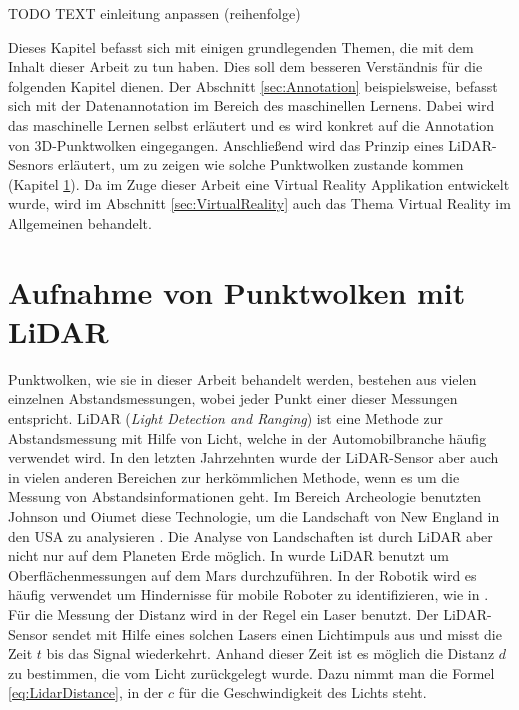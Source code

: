 \graphicspath{{Kapitel/Kapitel2_Grundlagen/Images/}}
TODO TEXT einleitung anpassen (reihenfolge)

Dieses Kapitel befasst sich mit einigen grundlegenden Themen, die mit dem Inhalt dieser Arbeit zu tun haben. Dies soll dem besseren Verständnis für die folgenden Kapitel dienen. Der Abschnitt \ref{sec:Annotation} beispielsweise, befasst sich mit der Datenannotation im Bereich des maschinellen Lernens. Dabei wird das maschinelle Lernen selbst erläutert und es wird konkret auf die Annotation von 3D-Punktwolken eingegangen. Anschließend wird das Prinzip eines LiDAR-Sesnors erläutert, um zu zeigen wie solche Punktwolken zustande kommen (Kapitel \ref{sec:Lidar}). Da im Zuge dieser Arbeit eine Virtual Reality Applikation entwickelt wurde, wird im Abschnitt \ref{sec:VirtualReality} auch das Thema Virtual Reality im Allgemeinen behandelt.

\section{Aufnahme von Punktwolken mit LiDAR}
\label{sec:Lidar}

Punktwolken, wie sie in dieser Arbeit behandelt werden, bestehen aus vielen einzelnen Abstandsmessungen, wobei jeder Punkt einer dieser Messungen entspricht. LiDAR (\textit{Light Detection and Ranging}) ist eine Methode zur Abstandsmessung mit Hilfe von Licht, welche in der Automobilbranche häufig verwendet wird. In den letzten Jahrzehnten wurde der LiDAR-Sensor aber auch in vielen anderen Bereichen zur herkömmlichen Methode, wenn es um die Messung von Abstandsinformationen geht. Im Bereich Archeologie benutzten Johnson und Oiumet diese Technologie, um die Landschaft von New England in den USA zu analysieren \cite{bib:LidarArcheology}. Die Analyse von Landschaften ist durch LiDAR aber nicht nur auf dem Planeten Erde möglich. In \cite{bib:LidarSpace} wurde LiDAR benutzt um Oberflächenmessungen auf dem Mars durchzuführen. In der Robotik wird es häufig verwendet um Hindernisse für mobile Roboter zu identifizieren, wie in \cite{bib:LidarRobotic}.\\

Für die Messung der Distanz wird in der Regel ein Laser benutzt. Der LiDAR-Sensor sendet mit Hilfe eines solchen Lasers einen Lichtimpuls aus und misst die Zeit $t$ bis das Signal wiederkehrt. Anhand dieser Zeit ist es möglich die Distanz $d$ zu bestimmen, die vom Licht zurückgelegt wurde. Dazu nimmt man die Formel \ref{eq:LidarDistance}, in der $c$ für die Geschwindigkeit des Lichts steht.

